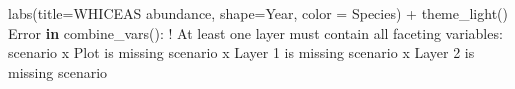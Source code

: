 \documentclass[
]{book}
\newenvironment{Shaded}{\begin{snugshade}}{\end{snugshade}}
\newcommand{\AttributeTok}[1]{\textcolor[rgb]{0.77,0.63,0.00}{#1}}
\newcommand{\ControlFlowTok}[1]{\textcolor[rgb]{0.13,0.29,0.53}{\textbf{#1}}}
\newcommand{\DecValTok}[1]{\textcolor[rgb]{0.00,0.00,0.81}{#1}}
\newcommand{\FunctionTok}[1]{\textcolor[rgb]{0.00,0.00,0.00}{#1}}
\newcommand{\NormalTok}[1]{#1}
\newcommand{\SpecialCharTok}[1]{\textcolor[rgb]{0.00,0.00,0.00}{#1}}
\newcommand{\StringTok}[1]{\textcolor[rgb]{0.31,0.60,0.02}{#1}}
\begin{document}
\begin{Shaded}
\begin{Highlighting}[]
  \FunctionTok{labs}\NormalTok{(}\AttributeTok{title=}\StringTok{\textquotesingle{}WHICEAS abundance\textquotesingle{}}\NormalTok{, }
       \AttributeTok{shape=}\StringTok{\textquotesingle{}Year\textquotesingle{}}\NormalTok{, }\AttributeTok{color =} \StringTok{\textquotesingle{}Species\textquotesingle{}}\NormalTok{) }\SpecialCharTok{+} 
  \FunctionTok{theme\_light}\NormalTok{()}
\NormalTok{Error }\ControlFlowTok{in} \StringTok{\textasciigrave{}}\AttributeTok{combine\_vars()}\StringTok{\textasciigrave{}}\SpecialCharTok{:}
\SpecialCharTok{!}\NormalTok{ At least one layer must contain all faceting variables}\SpecialCharTok{:} \StringTok{\textasciigrave{}}\AttributeTok{scenario}\StringTok{\textasciigrave{}}
\NormalTok{x Plot is missing }\StringTok{\textasciigrave{}}\AttributeTok{scenario}\StringTok{\textasciigrave{}}
\NormalTok{x Layer }\DecValTok{1}\NormalTok{ is missing }\StringTok{\textasciigrave{}}\AttributeTok{scenario}\StringTok{\textasciigrave{}}
\NormalTok{x Layer }\DecValTok{2}\NormalTok{ is missing }\StringTok{\textasciigrave{}}\AttributeTok{scenario}\StringTok{\textasciigrave{}}
\end{Highlighting}
\end{Shaded}

~
\end{document}
